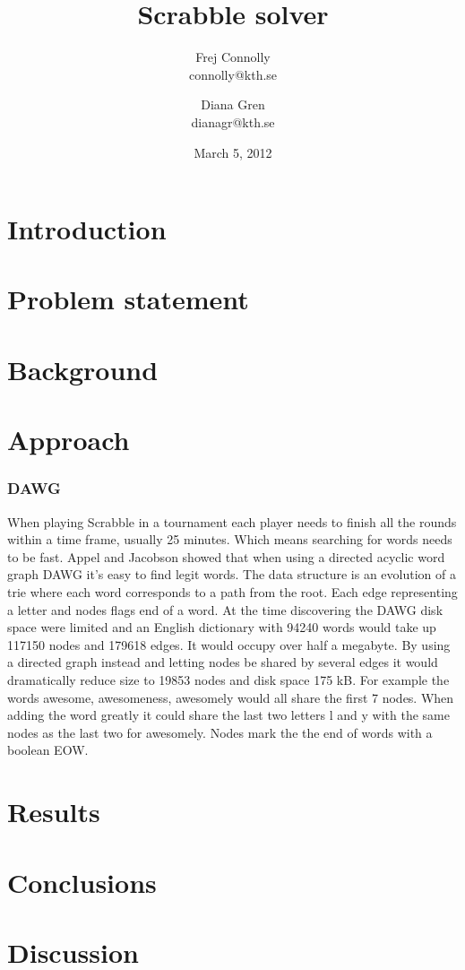 \documentclass[a4paper, 12pt]{report}
\begin{document}
\title{Scrabble solver}
\date{March 5, 2012}
\author{Frej Connolly \\ connolly@kth.se
        \and Diana Gren \\ dianagr@kth.se}

\maketitle
\tableofcontents


\chapter{Introduction}

\chapter{Problem statement}
\chapter{Background}
\chapter{Approach}
\subsection{DAWG}
When playing Scrabble in a tournament each player needs to finish all the rounds within a time frame, usually 25 minutes. Which means searching for words needs to be fast. Appel and Jacobson showed that when using a directed acyclic word graph DAWG it's easy to find legit words. The data structure is an evolution of a trie where each word corresponds to a path from the root. Each edge representing a letter and nodes flags end of a word. At the time discovering the DAWG disk space were limited and an English dictionary with 94240 words would take up 117150 nodes and 179618 edges. It would occupy over half a megabyte. By using a directed graph instead and letting nodes be shared by several edges it would dramatically reduce size to 19853 nodes and disk space 175 kB. For example the words awesome, awesomeness, awesomely would all share the first 7 nodes. When adding the word greatly it could share the last two letters l and y with the same nodes as the last two for awesomely. Nodes mark the the end of words with a boolean EOW.

\chapter{Results}
\chapter{Conclusions}
\chapter{Discussion}
\end{document}
